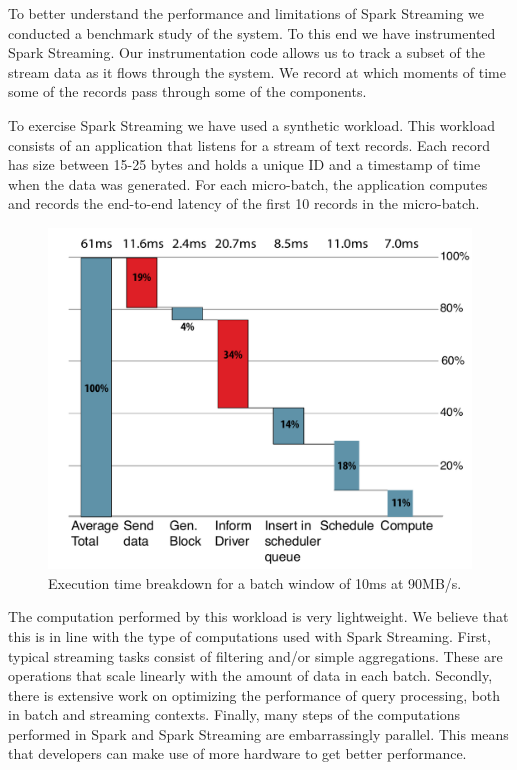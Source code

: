 
To better understand the performance and limitations of Spark Streaming we conducted a benchmark study of the system.
To this end we have instrumented Spark Streaming.
Our instrumentation code allows us to track a subset of the stream data as it flows through the system.
We record at which moments of time some of the records pass through some of the components.

To exercise Spark Streaming we have used a synthetic workload.
This workload consists of an application that listens for a stream of text records.
Each record has size between 15-25 bytes and holds a unique ID and a timestamp of time when the data was generated.
For each micro-batch, the application computes and records the end-to-end latency of the first 10 records in the micro-batch.

\begin{figure}[t!]
  \begin{center}
    \includegraphics[scale=0.40]{images_graphs/waterfall/Rplots_illustrator.pdf}
  \end{center}
  \caption{Execution time breakdown for a batch window of 10ms at 90MB/s.}
  \label{fig:SparkStreaming_time_breakdown}
\end{figure}

The computation performed by this workload is very lightweight.
We believe that this is in line with the type of computations used with Spark Streaming.
First, typical streaming tasks consist of filtering and/or simple aggregations.
These are operations that scale linearly with the amount of data in each batch.
Secondly, there is extensive work on optimizing the performance of query processing, both in batch and streaming contexts.
Finally, many steps of the computations performed in Spark and Spark Streaming are embarrassingly parallel. 
This means that developers can make use of more hardware to get better performance. 

